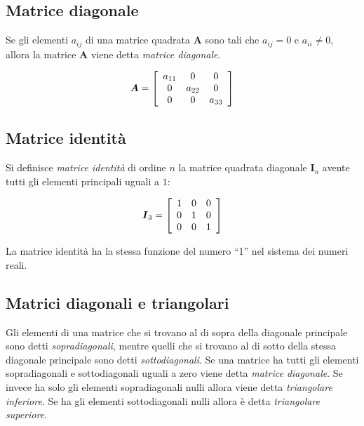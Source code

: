 \documentclass[
  11pt,
]{krantz}
\theoremstyle{definition}
\theoremstyle{definition}
\theoremstyle{definition}
\theoremstyle{definition}
\theoremstyle{remark}
\begin{document}
\hypertarget{matrice-diagonale}{%
\subsection{Matrice diagonale}\label{matrice-diagonale}}

Se gli elementi \(a_{ij}\) di una matrice quadrata \(\boldsymbol{A}\) sono tali che \(a_{ij} =0\) e \(a_{ii} \neq 0\), allora la matrice \(\boldsymbol{A}\) viene detta \emph{matrice diagonale}.

\[\boldsymbol{A} =  \left[ \begin{array}{c c c}
a_{11} & 0 & 0\\
0 & a_{22} & 0\\
0 & 0 & a_{33} \end{array} \right]\]

\hypertarget{matrice-identituxe0}{%
\subsection{Matrice identità}\label{matrice-identituxe0}}

Si definisce \emph{matrice identità} di ordine \(n\) la matrice quadrata diagonale \(\boldsymbol{I}_n\) avente tutti gli elementi principali uguali a \(1\):

\[\boldsymbol{I}_3 =  \left[ \begin{array}{c c c}
1 & 0 & 0\\
0 & 1 & 0\\
0 & 0 & 1 \end{array} \right]\]

La matrice identità ha la stessa funzione del numero ``1'' nel sistema dei numeri reali.

\hypertarget{matrici-diagonali-e-triangolari}{%
\subsection{Matrici diagonali e triangolari}\label{matrici-diagonali-e-triangolari}}

Gli elementi di una matrice che si trovano al di sopra della diagonale principale sono detti \emph{sopradiagonali}, mentre quelli che si trovano al di sotto della stessa diagonale principale sono detti \emph{sottodiagonali}. Se una matrice ha tutti gli elementi sopradiagonali e sottodiagonali uguali a zero viene detta \emph{matrice diagonale}. Se invece ha solo gli elementi sopradiagonali nulli allora viene detta \emph{triangolare inferiore}. Se ha gli elementi sottodiagonali nulli allora è detta \emph{triangolare superiore}.
\end{document}
